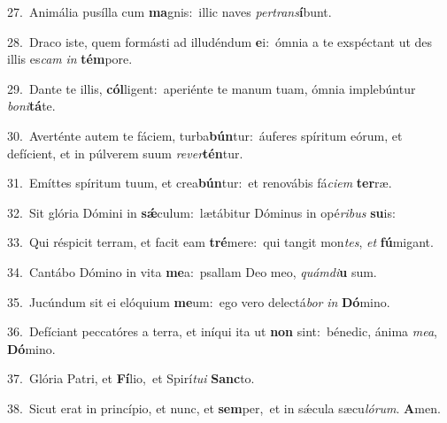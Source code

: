 {\numbfont\textcolor{\numbcolor}{27.}}~Animália pusílla cum \textbf{ma}\-gnis:~\star illic naves \textit{per}\-\textit{trans}\textbf{í}bunt.\par
{\numbfont\textcolor{\numbcolor}{28.}}~Draco iste, quem formásti ad illudéndum \textbf{e}\-i:~\star ómnia a te exspéctant ut des illis es\textit{cam} \textit{in} \textbf{tém}\-pore.\par
{\numbfont\textcolor{\numbcolor}{29.}}~Dante te illis, \textbf{cól}\-ligent:~\star aperiénte te manum tuam, ómnia implebúntur \textit{bo}\-\textit{ni}\textbf{tá}te.\par
{\numbfont\textcolor{\numbcolor}{30.}}~Averténte autem te fáciem, turba\-\textbf{bún}\-tur:~\star áuferes spíritum eórum, et defícient, et in púlverem suum \textit{re}\-\textit{ver}\textbf{tén}tur.\par
{\numbfont\textcolor{\numbcolor}{31.}}~Emíttes spíritum tuum, et crea\-\textbf{bún}\-tur:~\star et renovábis fá\-\textit{ci}\-\textit{em} \textbf{ter}\-ræ.\par
{\numbfont\textcolor{\numbcolor}{32.}}~Sit glória Dómini in \textbf{sǽ}\-culum:~\star lætábitur Dóminus in opé\-\textit{ri}\-\textit{bus} \textbf{su}\-is:\par
{\numbfont\textcolor{\numbcolor}{33.}}~Qui réspicit terram, et facit eam \textbf{tré}\-mere:~\star qui tangit mon\-\textit{tes}\-, \textit{et} \textbf{fú}\-migant.\par
{\numbfont\textcolor{\numbcolor}{34.}}~Cantábo Dómino in vita \textbf{me}\-a:~\star psallam Deo meo, \textit{quám}\-\textit{di}\textbf{u} sum.\par
{\numbfont\textcolor{\numbcolor}{35.}}~Jucúndum sit ei elóquium \textbf{me}\-um:~\star ego vero delectá\textit{bor} \textit{in} \textbf{Dó}\-mino.\par
{\numbfont\textcolor{\numbcolor}{36.}}~Defíciant peccatóres a terra, et iníqui ita ut \textbf{non} sint:~\star bénedic, ánima \textit{me}\-\textit{a}, \textbf{Dó}\-mino.\par
{\numbfont\textcolor{\numbcolor}{37.}}~Glória Patri, et \textbf{Fí}\-lio,~\star et Spirí\-\textit{tu}\-\textit{i} \textbf{Sanc}\-to.\par
{\numbfont\textcolor{\numbcolor}{38.}}~Sicut erat in princípio, et nunc, et \textbf{sem}\-per,~\star et in sǽcula sæcu\-\textit{ló}\-\textit{rum}. \textbf{A}\-men.\par
